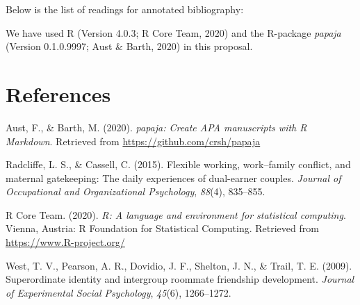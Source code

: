 \documentclass[
  english,
  man]{apa6}
\newlength{\cslhangindent}
\newenvironment{cslreferences}%
  {\setlength{\parindent}{0pt}%
  \everypar{\setlength{\hangindent}{\cslhangindent}}\ignorespaces}%
  {\par}
\begin{document}
Below is the list of readings for annotated bibliography:

We have used R (Version 4.0.3; R Core Team, 2020) and the R-package \emph{papaja} (Version 0.1.0.9997; Aust \& Barth, 2020) in this proposal.

\newpage

\hypertarget{references}{%
\section{References}\label{references}}

\begingroup
\setlength{\parindent}{-0.5in}
\setlength{\leftskip}{0.5in}

\hypertarget{refs}{}
\begin{cslreferences}
\leavevmode\hypertarget{ref-R-papaja}{}%
Aust, F., \& Barth, M. (2020). \emph{papaja: Create APA manuscripts with R Markdown}. Retrieved from \url{https://github.com/crsh/papaja}

\leavevmode\hypertarget{ref-radcliffe2015flexible}{}%
Radcliffe, L. S., \& Cassell, C. (2015). Flexible working, work--family conflict, and maternal gatekeeping: The daily experiences of dual-earner couples. \emph{Journal of Occupational and Organizational Psychology}, \emph{88}(4), 835--855.

\leavevmode\hypertarget{ref-R-base}{}%
R Core Team. (2020). \emph{R: A language and environment for statistical computing}. Vienna, Austria: R Foundation for Statistical Computing. Retrieved from \url{https://www.R-project.org/}

\leavevmode\hypertarget{ref-west2009superordinate}{}%
West, T. V., Pearson, A. R., Dovidio, J. F., Shelton, J. N., \& Trail, T. E. (2009). Superordinate identity and intergroup roommate friendship development. \emph{Journal of Experimental Social Psychology}, \emph{45}(6), 1266--1272.
\end{cslreferences}

\endgroup
\end{document}
